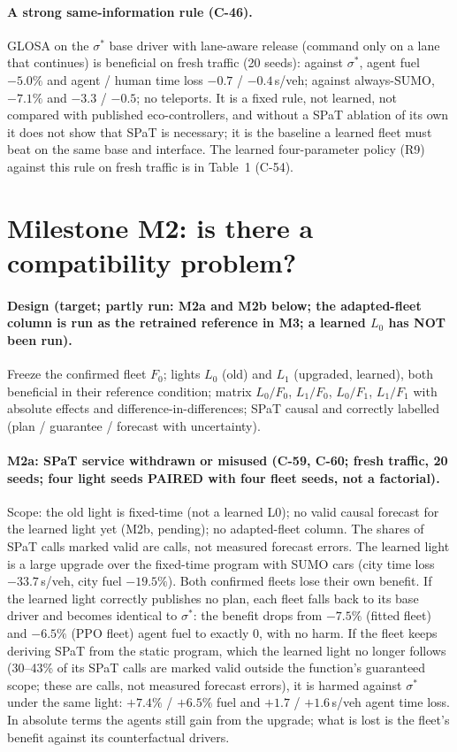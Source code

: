 \documentclass[11pt]{article}
\begin{document}
\paragraph{A strong same-information rule (C-46).} GLOSA on the $\sigma^*$ base driver with lane-aware release (command only on a lane
that continues) is beneficial on fresh traffic (20 seeds): against $\sigma^*$, agent fuel $-5.0\%$ and agent / human time loss $-0.7$ /
$-0.4$\,s/veh; against always-SUMO, $-7.1\%$ and $-3.3$ / $-0.5$; no teleports. It is a fixed rule, not learned, not compared with
published eco-controllers, and without a SPaT ablation of its own it does not show that SPaT is necessary; it is the baseline a learned
fleet must beat on the same base and interface.
The learned four-parameter policy (R9) against this rule on fresh traffic is in Table~1 (C-54).

\section{Milestone M2: is there a compatibility problem?}
\paragraph{Design (target; partly run: M2a and M2b below; the adapted-fleet column is run as the retrained reference in M3; a learned $L_0$ has NOT been run).} Freeze the confirmed fleet $F_0$; lights $L_0$ (old) and $L_1$ (upgraded, learned), both beneficial in their
reference condition; matrix $L_0/F_0$, $L_1/F_0$, $L_0/F_1$, $L_1/F_1$ with absolute effects and difference-in-differences; SPaT
causal and correctly labelled (plan / guarantee / forecast with uncertainty).
\paragraph{M2a: SPaT service withdrawn or misused (C-59, C-60; fresh traffic, 20 seeds; four light seeds PAIRED with four fleet
seeds, not a factorial).} Scope: the old light is fixed-time (not a learned L0); no valid causal forecast for the learned light yet
(M2b, pending); no adapted-fleet column. The shares of SPaT calls marked valid are calls, not measured forecast errors. The learned light is a large
upgrade over the fixed-time program with SUMO cars (city time loss $-33.7$\,s/veh, city fuel $-19.5\%$). Both confirmed fleets lose their
own benefit. If the learned light correctly publishes no plan, each fleet falls back to its base driver and becomes identical to
$\sigma^*$: the benefit drops from $-7.5\%$ (fitted fleet) and $-6.5\%$ (PPO fleet) agent fuel to exactly 0, with no harm. If the fleet
keeps deriving SPaT from the static program, which the learned light no longer follows (30--43\% of its SPaT calls are marked valid
outside the function's guaranteed scope; these are calls, not measured forecast errors), it is harmed against $\sigma^*$ under the same light: $+7.4\%$ / $+6.5\%$ fuel and $+1.7$ / $+1.6$\,s/veh agent time loss. In
absolute terms the agents still gain from the upgrade; what is lost is the fleet's benefit against its counterfactual drivers.
\end{document}
